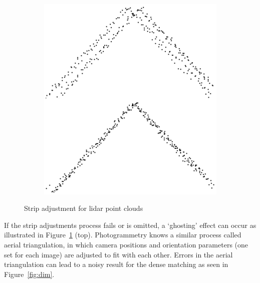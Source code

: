 \begin{figure}
\begin{subfigure}{0.4\linewidth}
		\includegraphics[width=\textwidth]{figs/strip_adjustment.png}
		\label{fig:lidarGableRoof}
	\end{subfigure}
	\caption{Strip adjustment for lidar point clouds}
	\label{fig:lidarStripAdj}
\end{figure}
If the strip adjustments process fails or is omitted, a `ghosting' effect can occur as illustrated in Figure~\ref{fig:lidarGableRoof} (top). 
Photogrammetry knows a similar process called aerial triangulation, in which camera positions and orientation parameters (one set for each image) are adjusted to fit with each other. Errors in the aerial triangulation can lead to a noisy result for the dense matching as seen in Figure~\ref{fig:dim}.
